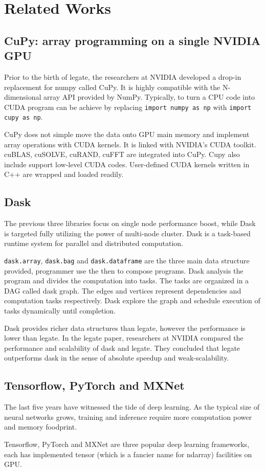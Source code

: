 \documentclass{article}
\newenvironment{newSec}[1]{
	\section{#1}
	\lhead{#1}
}{ \newpage }
\newenvironment{newSubsec}[1]{
	\subsection{#1}
}{}
\begin{document}
\begin{newSec}{Related Works}
	\begin{newSubsec}{CuPy: array programming on a single NVIDIA GPU}
		Prior to the birth of legate, the researchers at NVIDIA developed a drop-in replacement for numpy called CuPy\cite{cupy}.
		It is highly compatible with the N-dimensional array API provided by NumPy.
		Typically, to turn a CPU code into CUDA program can be achieve by replacing \texttt{import numpy as np} with \texttt{import cupy as np}.\par
		CuPy does not simple move the data onto GPU main memory and implement array operations with CUDA kernels.
		It is linked with NVIDIA's CUDA toolkit. cuBLAS, cuSOLVE, cuRAND, cuFFT are integrated into CuPy.
		Cupy also include support low-level CUDA codes. User-defined CUDA kernels written in C++ are wrapped and loaded readily.
	\end{newSubsec}

	\begin{newSubsec}{Dask}
		The previous three libraries focus on single node performance boost,
		while Dask\cite{dask} is targeted fully utilizing the power of multi-node cluster.
		Dask is a task-based runtime system for parallel and distributed computation.\par
		\texttt{dask.array}, \texttt{dask.bag} and \texttt{dask.dataframe} are the three main data structure provided,
		programmer use the then to compose programs.
		Dask analysis the program and divides the computation into tasks.
		The tasks are organized in a DAG called dask graph. The edges and vertices represent dependencies and computation tasks respectively.
		Dask explore the graph and schedule execution of tasks dynamically until completion.\par
		Dask provides richer data structures than legate, however the performance is lower than legate.
		In the legate paper, researchers at NVIDIA compared the performance and scalability of dask and legate.
		They concluded that legate outperforms dask in the sense of absolute speedup and weak-scalability.
	\end{newSubsec}

	\begin{newSubsec}{Tensorflow, PyTorch and MXNet}
		The last five years have witnessed the tide of deep learning.
		As the typical size of neural networks grows, training and inference require more computation power and memory foodprint.\par
		Tensorflow, PyTorch and MXNet are three popular deep learning frameworks, each has implemented tensor (which is a fancier name for ndarray) facilities on GPU.
	\end{newSubsec}
\end{newSec}
\end{document}
